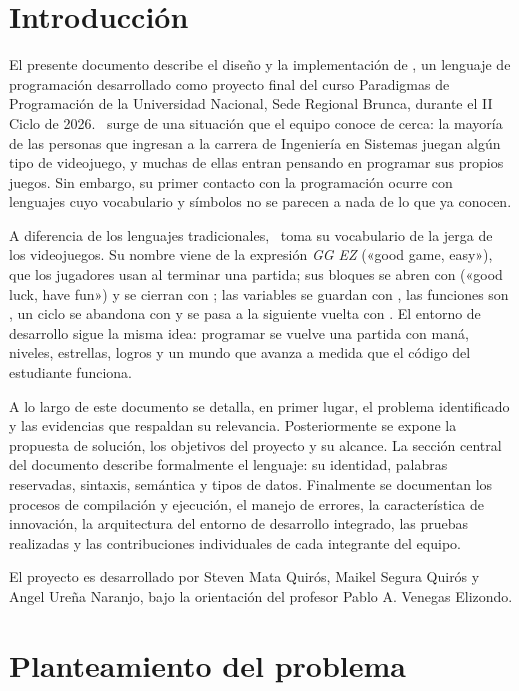 \section{Introducción}

El presente documento describe el diseño y la implementación de \ggez, un lenguaje de programación desarrollado como proyecto final del curso Paradigmas de Programación de la Universidad Nacional, Sede Regional Brunca, durante el II Ciclo de 2026. \ggez\ surge de una situación que el equipo conoce de cerca: la mayoría de las personas que ingresan a la carrera de Ingeniería en Sistemas juegan algún tipo de videojuego, y muchas de ellas entran pensando en programar sus propios juegos. Sin embargo, su primer contacto con la programación ocurre con lenguajes cuyo vocabulario y símbolos no se parecen a nada de lo que ya conocen.

A diferencia de los lenguajes tradicionales, \ggez\ toma su vocabulario de la jerga de los videojuegos. Su nombre viene de la expresión \emph{GG EZ} («good game, easy»), que los jugadores usan al terminar una partida; sus bloques se abren con  («good luck, have fun») y se cierran con ; las variables se guardan con , las funciones son , un ciclo se abandona con  y se pasa a la siguiente vuelta con . El entorno de desarrollo sigue la misma idea: programar se vuelve una partida con maná, niveles, estrellas, logros y un mundo que avanza a medida que el código del estudiante funciona.

A lo largo de este documento se detalla, en primer lugar, el problema identificado y las evidencias que respaldan su relevancia. Posteriormente se expone la propuesta de solución, los objetivos del proyecto y su alcance. La sección central del documento describe formalmente el lenguaje: su identidad, palabras reservadas, sintaxis, semántica y tipos de datos. Finalmente se documentan los procesos de compilación y ejecución, el manejo de errores, la característica de innovación, la arquitectura del entorno de desarrollo integrado, las pruebas realizadas y las contribuciones individuales de cada integrante del equipo.

El proyecto es desarrollado por Steven Mata Quirós, Maikel Segura Quirós y Angel Ureña Naranjo, bajo la orientación del profesor Pablo A. Venegas Elizondo.

\newpage
\section{Planteamiento del problema}

